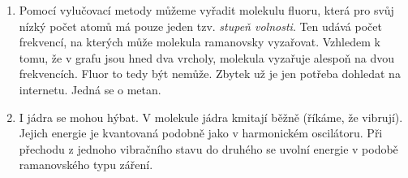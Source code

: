\documentclass{../../../../style/mkimain}
\begin{document}
\noindent{}
\klein
\begin{enumerate}
\item Pomocí vylučovací metody můžeme vyřadit molekulu fluoru,
    která pro svůj nízký počet atomů má pouze jeden tzv. \emph{stupeň volnosti}.
    Ten udává počet frekvencí, na kterých může molekula ramanovsky vyzařovat. Vzhledem k tomu, že v grafu jsou
    hned dva vrcholy, molekula vyzařuje alespoň na dvou frekvencích. Fluor to tedy být nemůže.
    Zbytek už je jen potřeba dohledat na internetu. Jedná se o metan.
\item I jádra se mohou hýbat. V molekule jádra kmitají běžně (říkáme, že vibrují). Jejich energie je kvantovaná podobně jako v harmonickém oscilátoru.
Při přechodu z jednoho vibračního stavu do druhého se uvolní energie v podobě ramanovského typu záření.
\end{enumerate}
\end{document}
